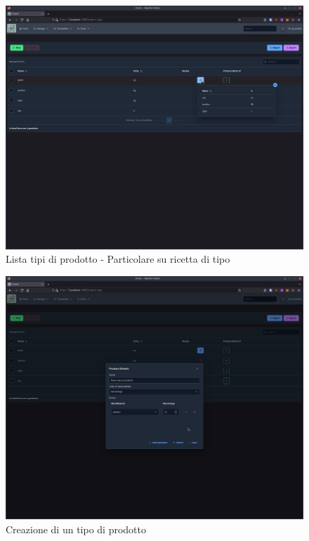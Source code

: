 \documentclass[a4paper,11pt]{article}
\begin{document}
\begin{figure}[H]
  \centering
  \includegraphics[width=0.5\linewidth]{screenIotChain/0008.png}
  \caption{Lista tipi di prodotto - Particolare su ricetta di tipo}
  \label{fig:screen8}
\end{figure}

\begin{figure}[H]
  \centering
  \includegraphics[width=0.5\linewidth]{screenIotChain/0009.png}
  \caption{Creazione di un tipo di prodotto}
  \label{fig:screen9}
\end{figure}
\end{document}
